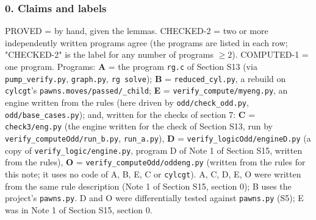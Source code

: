 \subsubsection*{0. Claims and labels}
PROVED = by hand, given the lemmas. CHECKED-2 = two or more independently written programs agree (the programs are listed in each row; "CHECKED-2" is the label for any number of programs $\ge2$). COMPUTED-1 = one program. Programs: \textbf{A} = the program \texttt{rg.c} of Section S13 (via \texttt{pump\_verify.py}, \texttt{graph.py}, \texttt{rg solve}); \textbf{B} = \texttt{reduced\_cyl.py}, a rebuild on \texttt{cylcgt}'s \texttt{pawns.moves/passed/\_child}; \textbf{E} = \texttt{verify\_compute/myeng.py}, an engine written from the rules (here driven by \texttt{odd/check\_odd.py}, \texttt{odd/base\_cases.py}); and, written for the checks of section 7: \textbf{C} = \texttt{check3/eng.py} (the engine written for the check of Section S13, run by \texttt{verify\_computeOdd/run\_b.py}, \texttt{run\_a.py}), \textbf{D} = \texttt{verify\_logicOdd/engineD.py} (a copy of \texttt{verify\_logic/engine.py}, program D of Note 1 of Section S15, written from the rules), \textbf{O} = \texttt{verify\_computeOdd/oddeng.py} (written from the rules for this note; it uses no code of A, B, E, C or \texttt{cylcgt}). A, C, D, E, O were written from the same rule description (Note 1 of Section S15, section 0); B uses the project's \texttt{pawns.py}. D and O were differentially tested against \texttt{pawns.py} (S5); E was in Note 1 of Section S15, section 0.

